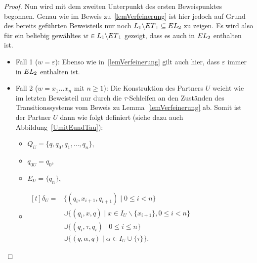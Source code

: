 \begin{proof}
  Nun wird mit dem zweiten Unterpunkt des ersten Beweispunktes begonnen. Genau
  wie im Beweis zu~\ref{lemVerfeinerung} ist hier jedoch auf Grund des bereits
  geführten Beweisteils nur noch $L_1\backslash ET{}_1\subseteq
  EL{}_2$ zu zeigen. Es wird also für ein beliebig gewähltes $w\in
  L_1\backslash ET{}_1$ gezeigt, dass es auch in $EL{}_2$ enthalten
  ist.
  \begin{itemize}
    \item Fall 1 ($w=\varepsilon$): Ebenso wie in~\ref{lemVerfeinerung} gilt
      auch hier, dass $\varepsilon$ immer in $EL{}_2$ enthalten ist.
    \item Fall 2 ($w=x_1\dots x_n$ mit $n\geq 1$): Die Konstruktion des
      Partners $U$ weicht wie im letzten Beweisteil nur durch die
      $\tau$-Schleifen an den Zuständen des Transitionssystems vom Beweis zu
      Lemma~\ref{lemVerfeinerung} ab. Somit ist der Partner $U$ dann wie folgt
      definiert (siehe dazu auch Abbildung~\ref{UmitEundTau}):
      \begin{itemize}
        \item $Q_U=\{q,q_0,q_1,\dots ,q_n\}$,
        \item $q_{0U}=q_0$,
        \item $E_U=\{q_n\}$,
        \item $\begin{aligned}[t]
            \delta _U=&\{(q_i,x_{i+1},q_{i+1})\mid 0\leq i< n\}\\
                      &\cup\{(q_i,x,q)\mid x\in I_U\backslash\{x_{i+1}\},0\leq
          i < n\}\\
          &\cup\{(q_i,\tau ,q_i)\mid 0\leq i\leq n\}\\
          &\cup\{(q,\alpha ,q)\mid \alpha\in I_U\cup \{\tau\}\}.
              \end{aligned}$
      \end{itemize}
      \begin{figure} [h!tbp]
      \begin{center}
\end{center}
\end{figure}
\end{itemize}
\end{proof}
